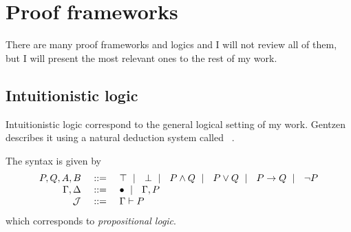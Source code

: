 \section{Proof frameworks}

There are many proof frameworks and logics and I will not review all of them,
but I will present the most relevant ones to the rest of my work.

\subsection{Intuitionistic logic}

Intuitionistic logic correspond to the general logical setting of my work.
Gentzen describes it using a natural deduction system called
\NJ~.

The syntax is given by
\[
  \begin{array}{rrl}
    P, Q, A, B &\ \mathrel{{:}{:}{=}}\ & \top \ \mid\ \  \bot \ \mid\ \  P \wedge Q \ \mid\ \  P \vee Q
    \ \mid\ \  P \to Q \ \mid\ \  \neg P \\
    \Gamma, \Delta &\ \mathrel{{:}{:}{=}}\ & \bullet \ \mid\ \  \Gamma, P \\
    \mathcal{J} &\ \mathrel{{:}{:}{=}}\ & \Gamma \vdash P
  \end{array}
\]
which corresponds to \emph{propositional logic}.

